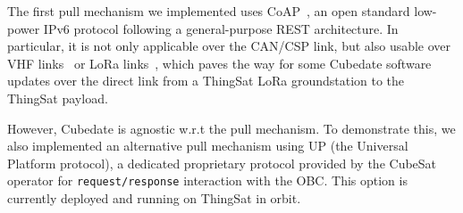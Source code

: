 The first pull mechanism we implemented uses CoAP~\cite{rfc7252}, an open standard
low-power IPv6 protocol following a general-purpose REST architecture. In particular,
it is not only applicable over the CAN/CSP link, but also usable over VHF links~\cite{palma2018vhf-coap}
or LoRa links~\cite{sanchez2018lora-coap}, which paves the way for some Cubedate
software updates over the direct link from a ThingSat LoRa groundstation to the ThingSat payload.

However, Cubedate is agnostic w.r.t the pull mechanism. To demonstrate this, we
also implemented an alternative pull mechanism using UP (the Universal Platform protocol),
a dedicated proprietary protocol provided by the CubeSat operator for \texttt{request/response}
interaction with the OBC. This option is currently deployed and running on ThingSat in orbit.
